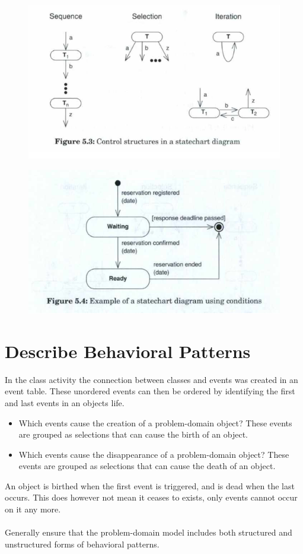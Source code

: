 \begin{figure}[H]
    \centering
    \includegraphics[width=\linewidth]{chapters/behavior/figures/statechart.png}
\end{figure}

\begin{figure}[H]
    \centering
    \includegraphics[width=\linewidth]{chapters/behavior/figures/condtion_statechart.png}
\end{figure}

\section{Describe Behavioral Patterns \ooad[98]}
In the class activity the connection between classes and events was created in an event table. These unordered events can then be ordered by identifying the first and last events in an objects life.
\begin{itemize}
    \item Which events cause the creation of a problem-domain object? These events are grouped as selections that can cause the birth of an object.
    \item Which events cause the disappearance of a problem-domain object? These events are grouped as selections that can cause the death of an object.
\end{itemize}
An object is birthed when the first event is triggered, and is dead when the last occurs. This does however not mean it ceases to exists, only events cannot occur on it any more.
\\\\
Generally ensure that the problem-domain model includes both structured and unstructured forms of behavioral patterns.


